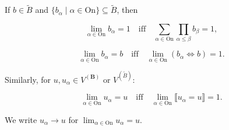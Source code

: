 If $b \in \tilde{B}$ and $\{b_{\alpha} \mid \alpha \in \mathrm{On}\} \subseteq \tilde{B}$, then

$$\lim_{\alpha \in \mathrm{On}} b_{\alpha} = 1 \quad \text{iff} \quad \sum_{\alpha \in \mathrm{On}} \prod_{\alpha \leq \beta} b_{\beta} = 1,$$

$$\lim_{\alpha \in \mathrm{On}} b_{\alpha} = b \quad \text{iff} \quad \lim_{\alpha \in \mathrm{On}} (b_{\alpha} \Leftrightarrow b) = 1.$$

Similarly, for $u, u_{\alpha} \in V^{(\mathbf{B})}$ or $V^{(\tilde{B})}$:

$$\lim_{\alpha \in \mathrm{On}} u_{\alpha} = u \quad \text{iff} \quad \lim_{\alpha \in \mathrm{On}} \llbracket u_{\alpha} = u \rrbracket = 1.$$

We write $u_{\alpha} \rightarrow u$ for $\lim_{\alpha \in \mathrm{On}} u_{\alpha} = u$.$$
